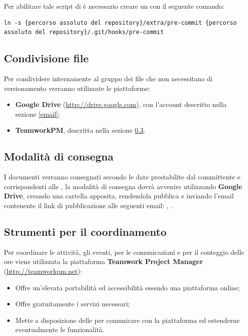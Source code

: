 Per abilitare tale script di  è necessario creare un  con il seguente comando:
\begin{lstlisting}
ln -s {percorso assoluto del repository}/extra/pre-commit {percorso assoluto del repository}/.git/hooks/pre-commit
\end{lstlisting}



\subsection{Condivisione file}

Per condividere internamente al gruppo dei file che non necessitano di versionamento verranno utilizzate le piattaforme:
\begin{itemize}
 \item \textbf{Google Drive} (\url{http://drive.google.com}), con l'account descritto nella sezione \ref{email};
 \item \textbf{TeamworkPM}, descritta nella sezione \ref{teamworkpm}.
\end{itemize}



\subsection{Modalità di consegna}
I documenti verranno consegnati secondo le date prestabilite dal committente e corrispondenti alle , la modalità di consegna dovrà avvenire utilizzando \textbf{Google Drive}, creando una cartella apposita, rendendola pubblica e inviando l'email contenente il link di pubblicazione alle seguenti email: , .



\subsection{Strumenti per il coordinamento}
\label{teamworkpm}

	Per coordinare le attività, gli eventi, per le comunicazioni e per il conteggio delle ore viene utilizzata la piattaforma \textbf{Teamwork Project Manager} (\url{http://teamworkpm.net}):
	\begin{itemize}
		\item Offre un'elevata portabilità ed accessibilità essendo una piattaforma online;
		\item Offre gratuitamente i servizi necessari;
		\item Mette a disposizione delle  per comunicare con la piattaforma ed estenderne eventualmente le funzionalità.
	\end{itemize}
	
